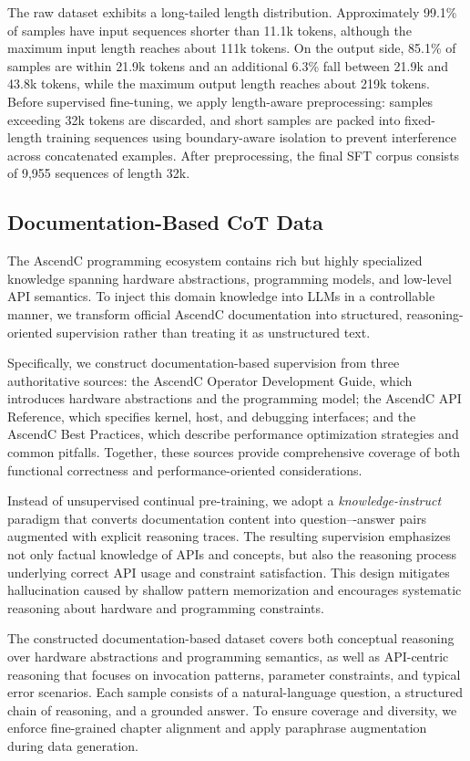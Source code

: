 The raw dataset exhibits a long-tailed length distribution. Approximately 99.1\% of samples have input sequences shorter than 11.1k tokens, although the maximum input length reaches about 111k tokens. On the output side, 85.1\% of samples are within 21.9k tokens and an additional 6.3\% fall between 21.9k and 43.8k tokens, while the maximum output length reaches about 219k tokens. Before supervised fine-tuning, we apply length-aware preprocessing: samples exceeding 32k tokens are discarded, and short samples are packed into fixed-length training sequences using boundary-aware isolation to prevent interference across concatenated examples. After preprocessing, the final SFT corpus consists of 9,955 sequences of length 32k.

\subsection{Documentation-Based CoT Data}
\label{document_dataset}

The AscendC programming ecosystem contains rich but highly specialized knowledge spanning hardware abstractions, programming models, and low-level API semantics. To inject this domain knowledge into LLMs in a controllable manner, we transform official AscendC documentation into structured, reasoning-oriented supervision rather than treating it as unstructured text.

Specifically, we construct documentation-based supervision from three authoritative sources: the AscendC Operator Development Guide, which introduces hardware abstractions and the programming model; the AscendC API Reference, which specifies kernel, host, and debugging interfaces; and the AscendC Best Practices, which describe performance optimization strategies and common pitfalls. Together, these sources provide comprehensive coverage of both functional correctness and performance-oriented considerations.

Instead of unsupervised continual pre-training, we adopt a \emph{knowledge-instruct} paradigm that converts documentation content into question–-answer pairs augmented with explicit reasoning traces. The resulting supervision emphasizes not only factual knowledge of APIs and concepts, but also the reasoning process underlying correct API usage and constraint satisfaction. This design mitigates hallucination caused by shallow pattern memorization and encourages systematic reasoning about hardware and programming constraints.

The constructed documentation-based dataset covers both conceptual reasoning over hardware abstractions and programming semantics, as well as API-centric reasoning that focuses on invocation patterns, parameter constraints, and typical error scenarios. Each sample consists of a natural-language question, a structured chain of reasoning, and a grounded answer. To ensure coverage and diversity, we enforce fine-grained chapter alignment and apply paraphrase augmentation during data generation.

